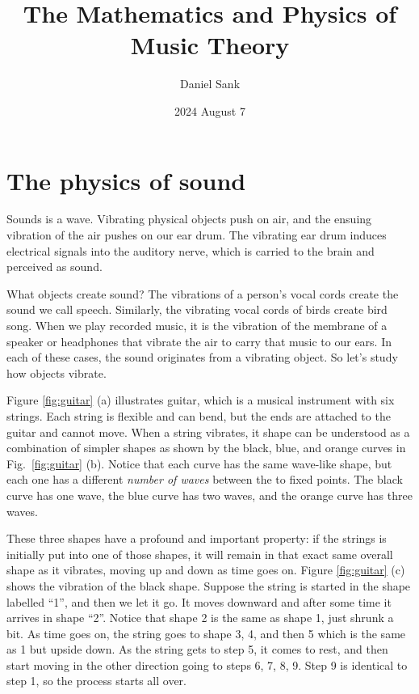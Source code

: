 \documentclass{article}
\author{Daniel Sank}
\date{2024 August 7}
\title{The Mathematics and Physics of Music Theory}
\begin{document}
\maketitle

\section{The physics of sound}

Sounds is a wave.
Vibrating physical objects push on air, and the ensuing vibration of the air pushes on our ear drum.
The vibrating ear drum induces electrical signals into the auditory nerve, which is carried to the brain and perceived as sound.

What objects create sound?
The vibrations of a person's vocal cords create the sound we call speech.
Similarly, the vibrating vocal cords of birds create bird song.
When we play recorded music, it is the vibration of the membrane of a speaker or headphones that vibrate the air to carry that music to our ears.
In each of these cases, the sound originates from a vibrating object.
So let's study how objects vibrate.

Figure \ref{fig:guitar} (a) illustrates guitar, which is a musical instrument with six strings.
Each string is flexible and can bend, but the ends are attached to the guitar and cannot move.
When a string vibrates, it shape can be understood as a combination of simpler shapes as shown by the black, blue, and orange curves in Fig.~\ref{fig:guitar} (b).
Notice that each curve has the same wave-like shape, but each one has a different \emph{number of waves} between the to fixed points.
The black curve has one wave, the blue curve has two waves, and the orange curve has three waves.

These three shapes have a profound and important property: if the strings is initially put into one of those shapes, it will remain in that exact same overall shape as it vibrates, moving up and down as time goes on.
Figure \ref{fig:guitar} (c) shows the vibration of the black shape.
Suppose the string is started in the shape labelled ``1'', and then we let it go.
It moves downward and after some time it arrives in shape ``2''.
Notice that shape 2 is the same as shape 1, just shrunk a bit.
As time goes on, the string goes to shape 3, 4, and then 5 which is the same as 1 but upside down.
As the string gets to step 5, it comes to rest, and then start moving in the other direction going to steps 6, 7, 8, 9.
Step 9 is identical to step 1, so the process starts all over.
\end{document}
